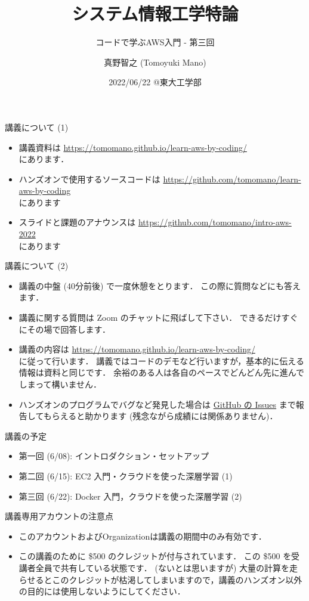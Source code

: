 \documentclass[unicode,11pt]{beamer}
\title{システム情報工学特論}
\subtitle{コードで学ぶAWS入門 - 第三回}
\author{真野智之 (Tomoyuki Mano)}
\institute[OIST]{Okinawa Institute of Science and Technology (OIST)}
\date{2022/06/22 @東大工学部}
\begin{document}
\frame{\titlepage}

\begin{frame}{講義について (1)}
\begin{itemize}
    \item 講義資料は
    \url{https://tomomano.github.io/learn-aws-by-coding/}\\
    にあります．
    \item ハンズオンで使用するソースコードは \url{https://github.com/tomomano/learn-aws-by-coding}\\
    にあります
    \item スライドと課題のアナウンスは
    \url{https://github.com/tomomano/intro-aws-2022}\\
    にあります
\end{itemize}
\end{frame}

\begin{frame}{講義について (2)}
\begin{itemize}
    \item 講義の中盤 (40分前後) で一度休憩をとります．
    この際に質問などにも答えます．
    \item 講義に関する質問は Zoom のチャットに飛ばして下さい．
    できるだけすぐにその場で回答します．
    \item 講義の内容は
    \url{https://tomomano.github.io/learn-aws-by-coding/}\\
    に従って行います．
    講義ではコードのデモなど行いますが，基本的に伝える情報は資料と同じです．
    余裕のある人は各自のペースでどんどん先に進んでしまって構いません．
    \item ハンズオンのプログラムでバグなど発見した場合は
    \href{https://github.com/tomomano/learn-aws-by-coding/issues}{GitHub の Issues}
    まで報告してもらえると助かります (残念ながら成績には関係ありません)．
\end{itemize}

\end{frame}

\begin{frame}{講義の予定}
    \begin{itemize}
        \item 第一回 (6/08): イントロダクション・セットアップ
        \item 第二回 (6/15): EC2 入門・クラウドを使った深層学習 (1)
        \item 第三回 (6/22): Docker 入門，クラウドを使った深層学習 (2)
    \end{itemize}
\end{frame}

\begin{frame}{講義専用アカウントの注意点}

\begin{itemize}
    \item このアカウントおよびOrganizationは講義の期間中のみ有効です．
    \item この講義のために \$500 のクレジットが付与されています．
    この \$500 を受講者全員で共有している状態です．
    (ないとは思いますが) 大量の計算を走らせるとこのクレジットが枯渇してしまいますので，講義のハンズオン以外の目的には使用しないようにしてください．
\end{itemize}

\end{frame}
\end{document}

